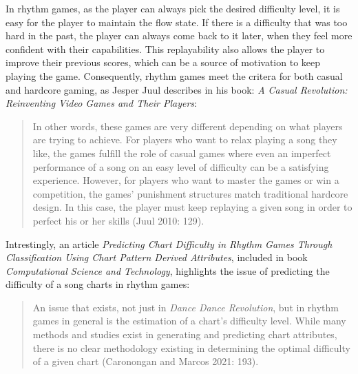 In rhythm games, as the player can always pick the desired difficulty level, it is easy for the player to maintain the flow state. If there is a difficulty that was too hard in the past, the player can always come back to it later, when they feel more confident with their capabilities. This replayability also allows the player to improve their previous scores, which can be a source of motivation to keep playing the game. Consequently, rhythm games meet the critera for both casual and hardcore gaming, as Jesper Juul describes in his book: \textit{A Casual Revolution: Reinventing Video Games and Their Players}\cite{casualrevolution}:

\begin{quote}
    In other words, these games are very different depending on what players are trying to achieve. For players who want to relax playing a song they like, the games fulfill the role of casual games where even an imperfect performance of a song on an easy level of difficulty can be a satisfying experience. However, for players who want to master the games or win a competition, the games’ punishment structures match traditional hardcore design. In this case, the player must keep replaying a given song in order to perfect his or her skills (Juul 2010: 129).
\end{quote}

Intrestingly, an article \textit{Predicting Chart Difficulty in Rhythm Games Through Classification Using Chart Pattern Derived Attributes}, included in book \textit{Computational Science and Technology}, highlights the issue of predicting the difficulty of a song charts in rhythm games: 

\begin{quote}
    An issue that exists, not just in \textit{Dance Dance Revolution}, but in rhythm games in general is the estimation of a chart’s difficulty level. While many methods and studies exist in generating and predicting chart attributes, there is no clear methodology existing in determining the optimal difficulty of a given chart (Caronongan and Marcos 2021: 193).
\end{quote}
 
